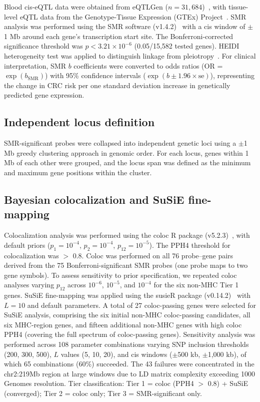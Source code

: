 \documentclass[11pt,a4paper]{article}
\begin{document}
Blood cis-eQTL data were obtained from eQTLGen ($n=31,684$)~\cite{vosa2021eqtlgen},
with tissue-level eQTL data from the Genotype-Tissue Expression (GTEx)
Project~\cite{gtex2020}. SMR analysis
was performed using the SMR software (v1.4.2)~\cite{zhu2016integration} with a cis window of $\pm$1 Mb
around each gene's transcription start site. The Bonferroni-corrected
significance threshold was $p < 3.21 \times 10^{-6}$ (0.05/15,582 tested
genes). HEIDI heterogeneity test was applied to distinguish linkage from
pleiotropy~\cite{wu2018integrative}. For clinical interpretation, SMR $b$ coefficients were converted
to odds ratios (OR = $\exp(b_{\text{SMR}})$) with 95\% confidence intervals
($\exp(b \pm 1.96 \times \text{se})$), representing the change in CRC risk per
one standard deviation increase in genetically predicted gene expression.

\subsection{Independent locus definition}

SMR-significant probes were collapsed into independent genetic loci using a
$\pm$1 Mb greedy clustering approach in genomic order. For each locus, genes
within 1 Mb of each other were grouped, and the locus span was defined as the
minimum and maximum gene positions within the cluster.

\subsection{Bayesian colocalization and SuSiE fine-mapping}

Colocalization analysis was performed using the coloc R package (v5.2.3)~\cite{giambartolomei2014},
with default priors ($p_1 = 10^{-4}$, $p_2 = 10^{-4}$, $p_{12} = 10^{-5}$).
The PPH4 threshold for colocalization was $>$ 0.8. Coloc was performed on
all 76 probe--gene pairs derived from the 75 Bonferroni-significant SMR
probes (one probe maps to two gene symbols). To assess sensitivity to
prior specification, we repeated coloc analyses varying $p_{12}$ across
$10^{-6}$, $10^{-5}$, and $10^{-4}$ for the six non-MHC Tier 1 genes. SuSiE
fine-mapping was applied using the susieR package (v0.14.2)~\cite{wang2020susie} with $L=10$ and
default parameters. A total of 27 coloc-passing genes were selected for SuSiE
analysis, comprising the six initial non-MHC coloc-passing candidates, all six
MHC-region genes, and fifteen additional non-MHC genes with high coloc PPH4
(covering the full spectrum of coloc-passing genes). Sensitivity analysis
was performed across 108 parameter combinations varying SNP inclusion
thresholds (200, 300, 500), $L$ values (5, 10, 20), and cis windows ($\pm$500
kb, $\pm$1,000 kb), of which 65 combinations (60\%) succeeded. The 43 failures
were concentrated in the chr2:219Mb region at large windows due to LD matrix
complexity exceeding 1000 Genomes resolution. Tier
classification: Tier 1 = coloc (PPH4 $>$ 0.8) + SuSiE (converged); Tier 2 =
coloc only; Tier 3 = SMR-significant only.
\end{document}
